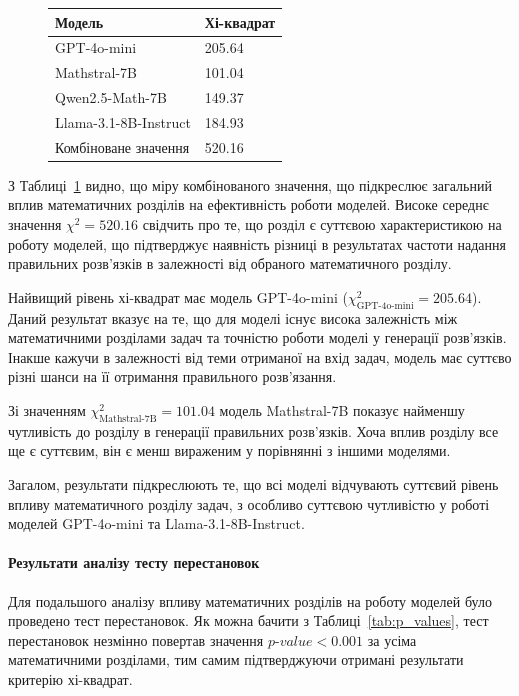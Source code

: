 \begin{figure}[!h]
    \centering
    \label{tab:chi_square_results}
    \begin{tabular}{|l|l|}
    \hline
    Модель & Хі-квадрат \\
    \hline
    GPT-4o-mini & 205.64 \\
    Mathstral-7B & 101.04 \\
    Qwen2.5-Math-7B & 149.37 \\
    Llama-3.1-8B-Instruct & 184.93 \\
    \hline
    Комбіноване значення & 520.16 \\
    \hline
    \end{tabular}
\end{figure}

З Таблиці~\ref{tab:chi_square_results} видно, що міру комбінованого значення, що підкреслює загальний вплив математичних розділів на ефективність роботи моделей. Високе середнє значення $\chi^2=520.16$ свідчить про те, що розділ є суттєвою характеристикою на роботу моделей, що підтверджує наявність різниці в результатах частоти надання правильних розв'язків в залежності від обраного математичного розділу.

Найвищий рівень хі-квадрат має модель GPT-4o-mini ($\chi^2_{\text{GPT-4o-mini}}=205.64$). Даний результат вказує на те, що для моделі існує висока залежність між математичними розділами задач та точністю роботи моделі у генерації розв'язків. Інакше кажучи в залежності від теми отриманої на вхід задач, модель має суттєво різні шанси на її отримання правильного розв'язання.

Зі значенням $\chi^2_{\text{Mathstral-7B}}=101.04$ модель Mathstral-7B показує найменшу чутливість до розділу в генерації правильних розв’язків. Хоча вплив розділу все ще є суттєвим, він є менш вираженим у порівнянні з іншими моделями.

Загалом, результати підкреслюють те, що всі моделі відчувають суттєвий рівень впливу математичного розділу задач, з особливо суттєвою чутливістю у роботі моделей GPT-4o-mini та Llama-3.1-8B-Instruct.

\paragraph{Результати аналізу тесту перестановок}
Для подальшого аналізу впливу математичних розділів на роботу моделей було проведено тест перестановок. Як можна бачити з Таблиці~\ref{tab:p_values}, тест перестановок незмінно повертав значення $p\text{-}value < 0.001$ за усіма математичними розділами, тим самим підтверджуючи отримані результати критерію хі-квадрат.

